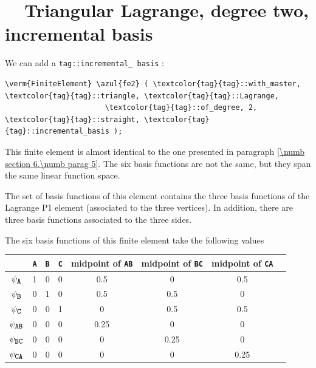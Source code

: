 \section{~~Triangular Lagrange, degree two, incremental basis}
\label{\numb section 6.\numb parag 6}

We can add a {\small\tt\textcolor{tag}{tag}::incremental\_\,basis} :

\begin{Verbatim}[commandchars=\\\{\},formatcom=\small\tt,frame=single,
   label=parag-\ref{\numb section 6.\numb parag 6}.cpp,rulecolor=\color{moldura},
   baselinestretch=0.94,framesep=2mm                                            ]
   \verm{FiniteElement} \azul{fe2} ( \textcolor{tag}{tag}::with_master, \textcolor{tag}{tag}::triangle, \textcolor{tag}{tag}::Lagrange,
                       \textcolor{tag}{tag}::of_degree, 2, \textcolor{tag}{tag}::straight, \textcolor{tag}{tag}::incremental_basis );
\end{Verbatim}

This finite element is almost identical to the one presented in paragraph
\ref{\numb section 6.\numb parag 5}.
The six basis functions are not the same, but they span the same linear function space.

The set of basis functions of this element contains the three basis functions of the
Lagrange P1 element (associated to the three vertices).
In addition, there are three basis functions associated to the three sides.
\vfil\eject

The six basis functions of this finite element take the following values

\begin{center}\begin{tabular}{ | c || c | c | c | c | c | c | c | }
  \hline
  & {\small\tt A} & {\small\tt B} & {\small\tt C} & midpoint of {\small\tt AB} &
  midpoint of {\small\tt BC} & midpoint of {\small\tt CA}
  \\ \hline\hline
  $ \psi_{\mbox{\small\tt A}} $ & 1 & 0 & 0 & 0.5 & 0 & 0.5
  \\ \hline
  $ \psi_{\mbox{\small\tt B}} $ & 0 & 1 & 0 & 0.5 & 0.5 & 0
  \\ \hline
  $ \psi_{\mbox{\small\tt C}} $ & 0 & 0 & 1 & 0 & 0.5 & 0.5
  \\ \hline
  $ \psi_{\mbox{\small\tt AB}} $ & 0 & 0 & 0 & 0.25 & 0 & 0
  \\ \hline
  $ \psi_{\mbox{\small\tt BC}} $ & 0 & 0 & 0 & 0 & 0.25 & 0
  \\ \hline
  $ \psi_{\mbox{\small\tt CA}} $ & 0 & 0 & 0 & 0 & 0 & 0.25
  \\ \hline
\end{tabular}\end{center}

